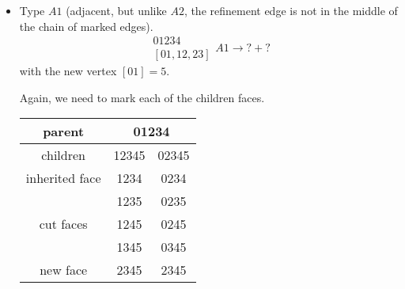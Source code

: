 \documentclass[a4paper,12pt]{amsart}
\numberwithin{equation}{section}
\begin{document}
\begin{itemize}
	\item Type $A1$ (adjacent, but unlike $A2$, the refinement edge is not in the middle of the chain of marked edges).
	$$ \begin{array}{c} 01234 \\ \left[01,12,23\right] \end{array} A1
	\rightarrow ? + ? $$
	with the new vertex $\left[01\right] = 5$.
	
	
	
    Again, we need to mark each of the children faces. 

    \begin{minipage}[]{0.5\textwidth}
  \begin{center}
	
	\begin{tabular}{|c|c|c|} \hline
	parent & \multicolumn{2}{|c|}{01234} \\ \hline
	children & 12345 & 02345 \\ \hline
	inherited face & 1234 & 0234 \\ \hline
	\multirow{3}{*}{cut faces} & 1235 & 0235 \\ 
	 & 1245 & 0245 \\ 
	 & 1345 & 0345 \\ \hline
	 new face & 2345 & 2345 \\ \hline
	\end{tabular}
  \end{center}
\end{minipage}
\hfill
    \begin{minipage}[]{0.5\textwidth}
  \begin{center}
	

\end{center}
\end{minipage}
\end{itemize}
\end{document}
